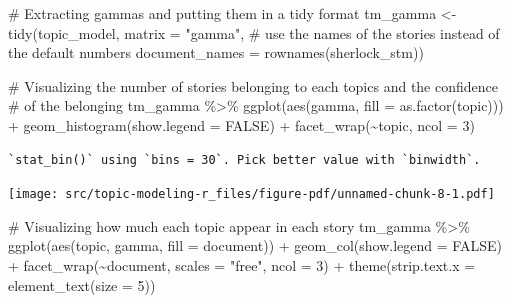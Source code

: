 \documentclass[
  letterpaper,
  DIV=11,
  numbers=noendperiod]{scrreprt}
\newenvironment{Shaded}{\begin{snugshade}}{\end{snugshade}}
\newcommand{\AttributeTok}[1]{\textcolor[rgb]{0.40,0.45,0.13}{#1}}
\newcommand{\CommentTok}[1]{\textcolor[rgb]{0.37,0.37,0.37}{#1}}
\newcommand{\ConstantTok}[1]{\textcolor[rgb]{0.56,0.35,0.01}{#1}}
\newcommand{\DecValTok}[1]{\textcolor[rgb]{0.68,0.00,0.00}{#1}}
\newcommand{\FunctionTok}[1]{\textcolor[rgb]{0.28,0.35,0.67}{#1}}
\newcommand{\NormalTok}[1]{\textcolor[rgb]{0.00,0.23,0.31}{#1}}
\newcommand{\OtherTok}[1]{\textcolor[rgb]{0.00,0.23,0.31}{#1}}
\newcommand{\SpecialCharTok}[1]{\textcolor[rgb]{0.37,0.37,0.37}{#1}}
\newcommand{\StringTok}[1]{\textcolor[rgb]{0.13,0.47,0.30}{#1}}
\begin{document}
\begin{Shaded}
\begin{Highlighting}[]
\CommentTok{\# Extracting gammas and putting them in a tidy format}
\NormalTok{tm\_gamma }\OtherTok{\textless{}{-}} \FunctionTok{tidy}\NormalTok{(topic\_model, }\AttributeTok{matrix =} \StringTok{"gamma"}\NormalTok{,}
                 \CommentTok{\# use the names of the stories instead of the default numbers}
                 \AttributeTok{document\_names =} \FunctionTok{rownames}\NormalTok{(sherlock\_stm))}


\CommentTok{\# Visualizing the number of stories belonging to each topics and the confidence}
\CommentTok{\#   of the belonging}
\NormalTok{tm\_gamma }\SpecialCharTok{\%\textgreater{}\%} 
  \FunctionTok{ggplot}\NormalTok{(}\FunctionTok{aes}\NormalTok{(gamma, }\AttributeTok{fill =} \FunctionTok{as.factor}\NormalTok{(topic))) }\SpecialCharTok{+}
  \FunctionTok{geom\_histogram}\NormalTok{(}\AttributeTok{show.legend =} \ConstantTok{FALSE}\NormalTok{) }\SpecialCharTok{+}
  \FunctionTok{facet\_wrap}\NormalTok{(}\SpecialCharTok{\textasciitilde{}}\NormalTok{topic, }\AttributeTok{ncol =} \DecValTok{3}\NormalTok{)}
\end{Highlighting}
\end{Shaded}

\begin{verbatim}
`stat_bin()` using `bins = 30`. Pick better value with `binwidth`.
\end{verbatim}

\texttt{[image: src/topic-modeling-r\_files/figure-pdf/unnamed-chunk-8-1.pdf]}

\begin{Shaded}
\begin{Highlighting}[]
\CommentTok{\# Visualizing how much each topic appear in each story}
\NormalTok{tm\_gamma }\SpecialCharTok{\%\textgreater{}\%} 
  \FunctionTok{ggplot}\NormalTok{(}\FunctionTok{aes}\NormalTok{(topic, gamma, }\AttributeTok{fill =}\NormalTok{ document)) }\SpecialCharTok{+}
  \FunctionTok{geom\_col}\NormalTok{(}\AttributeTok{show.legend =} \ConstantTok{FALSE}\NormalTok{) }\SpecialCharTok{+}
  \FunctionTok{facet\_wrap}\NormalTok{(}\SpecialCharTok{\textasciitilde{}}\NormalTok{document, }\AttributeTok{scales =} \StringTok{"free"}\NormalTok{, }\AttributeTok{ncol =} \DecValTok{3}\NormalTok{) }\SpecialCharTok{+}
  \FunctionTok{theme}\NormalTok{(}\AttributeTok{strip.text.x =} \FunctionTok{element\_text}\NormalTok{(}\AttributeTok{size =} \DecValTok{5}\NormalTok{))}
\end{Highlighting}
\end{Shaded}
\end{document}
